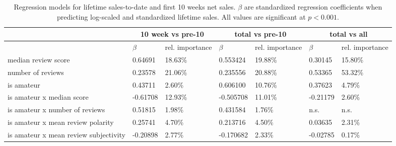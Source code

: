 \documentclass{sig-alternate}
\begin{document}
\begin{table}[tb]
\centering
\small
\sffamily
\begin{tabular}{lllllll}
& \multicolumn{2}{c}{\textbf{10 week vs pre-10}} & \multicolumn{2}{c}{\textbf{total vs pre-10}} & \multicolumn{2}{c}{\textbf{total vs all}}\\ 
\midrule & \textbf{$\beta$} & rel. importance & \textbf{$\beta$} & rel.
importance & \textbf{$\beta$} & rel. importance\\ 
median review score & 0.64691 & 18.63\% & 0.553424 & 19.88\% & 0.30145 & 15.80\%\\ 
number of reviews & 0.23578 & 21.06\% & 0.235556 & 20.88\% & 0.53365 & 53.32\%\\ 
is amateur & 0.43711 & 2.60\% & 0.606100 & 10.76\% & 0.37623 & 4.79\%\\ 
is amateur x median score  & -0.61708 & 12.93\% & -0.505708 & 11.01\% & -0.21179 & 2.60\%\\  
is amateur x number of reviews & 0.51815 & 1.98\% & 0.431584 & 1.76\% & n.s. & n.s. \\ 
is amateur x mean review polarity & 0.25741 & 4.70\% & 0.213716 & 4.50\% & 0.03635 & 2.31\%\\ 
is amateur x mean review subjectivity & -0.20898 & 2.77\% & -0.170682 & 2.33\% & -0.02785 & 0.17\%\\ 

\end{tabular}
\caption{Regression models for lifetime sales-to-date and first 10 weeks net sales. $\beta$ are standardized regression coefficients when predicting log-scaled and standardized lifetime sales. All values are significant at $p < 0.001$.}
\label{tab:sales_allmodel_lm}
\end{table}

\end{document}

